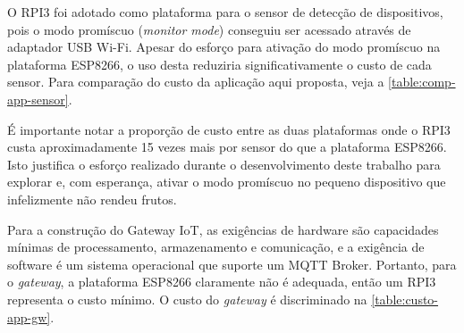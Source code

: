 O RPI3 foi adotado como plataforma para o sensor de detecção de dispositivos,
pois o modo promíscuo (\emph{monitor mode}) conseguiu ser acessado através de
adaptador USB Wi-Fi. Apesar do esforço para ativação do modo promíscuo na
plataforma ESP8266, o uso desta reduziria significativamente o custo de cada
sensor. Para comparação do custo da aplicação aqui proposta, veja a
\autoref{table:comp-app-sensor}.

\begin{table}[htb]
\end{table}
\FloatBarrier

É importante notar a proporção de custo entre as duas plataformas onde o RPI3
custa aproximadamente 15 vezes mais por sensor do que a plataforma ESP8266. Isto
justifica o esforço realizado durante o desenvolvimento deste trabalho para
explorar e, com esperança, ativar o modo promíscuo no pequeno dispositivo que
infelizmente não rendeu frutos.

Para a construção do Gateway IoT, as exigências de hardware são capacidades
mínimas de processamento, armazenamento e comunicação, e a exigência de software é
um sistema operacional que suporte um MQTT Broker. Portanto, para o
\emph{gateway}, a plataforma ESP8266 claramente não é adequada, então um RPI3
representa o custo mínimo. O custo do \emph{gateway} é discriminado na
\autoref{table:custo-app-gw}.

